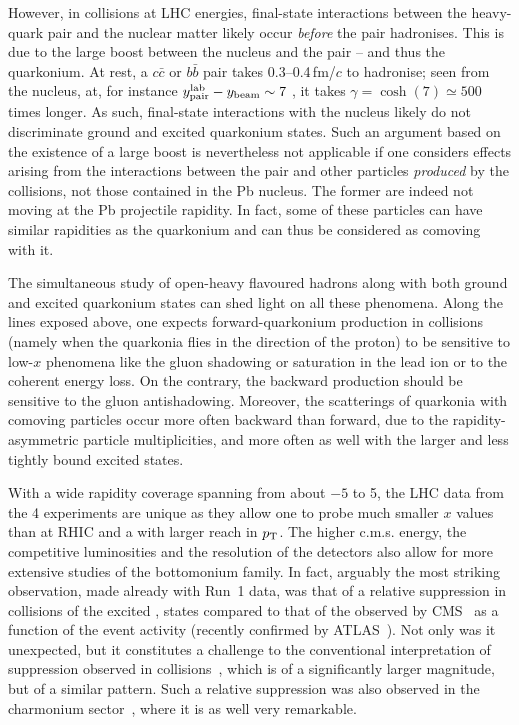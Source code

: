 \documentclass[../report.tex]{subfiles}
\begin{document}
However, in \pPb collisions at LHC energies, final-state interactions between the heavy-quark pair and the nuclear matter likely occur {\it before} the pair hadronises. This is due to the large boost between the nucleus and the pair -- and thus the quarkonium. At rest, a $c \bar c$ or $b\bar b$ pair takes 0.3--0.4\,fm/$c$ to hadronise; seen from the nucleus, at, for instance $y^{\rm lab}_{\rm pair}-y_{\rm beam} \sim 7$ , it takes $\gamma=\cosh(7) \simeq 500$ times longer. As such, final-state interactions with the nucleus likely do not discriminate ground and excited quarkonium states. Such an argument based on the existence of a large boost is nevertheless not applicable if one considers effects arising from the interactions between the pair and other particles {\it produced} by the \pPb collisions, not those contained in the Pb nucleus. The former are indeed not moving at the Pb projectile rapidity. In fact, some of these particles can have similar rapidities as the quarkonium and can thus be considered as comoving with it.
 
The simultaneous study of open-heavy flavoured hadrons along with both ground and excited quarkonium states can shed light on all these phenomena. Along the lines exposed above, one expects forward-quarkonium production in \pPb collisions (namely when the quarkonia flies in the direction of the proton) to be sensitive to low-$x$ phenomena like the gluon shadowing or saturation in the lead ion or to the coherent energy loss. On the contrary, the backward production should be sensitive to the gluon antishadowing. Moreover, the scatterings of quarkonia with comoving particles occur more often backward than forward, due to the rapidity-asymmetric particle multiplicities, and more often as well with the larger and less tightly bound excited states. 
   
With a wide rapidity coverage spanning from about $-5$ to 5, the LHC data from the 4 experiments are unique as they allow one to probe much smaller $x$ values than at RHIC and a with larger reach in $p\sb{\scriptstyle\mathrm{T}}$. The higher c.m.s. energy, the competitive luminosities and the resolution of the detectors also allow for more extensive studies of the bottomonium family. In fact, arguably the most striking observation, made already with Run~1 data, was that of a relative suppression in \pPb collisions of the excited , states compared to that of the  observed by CMS~\cite{Chatrchyan:2013nza} as a function of the event activity (recently confirmed by ATLAS~\cite{Aaboud:2017cif}). Not only was it unexpected, but it constitutes a challenge to the conventional interpretation of suppression observed in \PbPb collisions~\cite{Chatrchyan:2012lxa,Sirunyan:2017lzi,Sirunyan:2018nsz}, which is of a significantly larger magnitude, but of a similar pattern. Such a relative suppression was also observed in the charmonium sector~\cite{Abelev:2014zpa}, where it is as well very remarkable.
\end{document}
